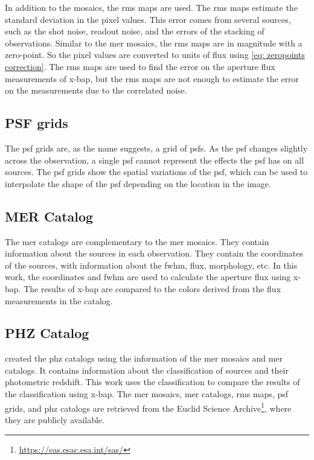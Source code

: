 In addition to the mosaics, the \gls{rms} maps are used. The \gls{rms} maps estimate the standard deviation in the pixel values. This error comes from several sources, such as the shot noise, readout noise, and the errors of the stacking of observations. Similar to the \gls{mer} mosaics, the \gls{rms} maps are in magnitude with a zero-point. So the pixel values are converted to units of flux using \autoref{eq: zeropoints correction}. The \gls{rms} maps are used to find the error on the aperture flux measurements of \gls{x-bap}, but the \gls{rms} maps are not enough to estimate the error on the measurements due to the correlated noise.

\subsection{PSF grids}

The \gls{psf} grids are, as the name suggests, a grid of \glspl{psf}. As the \gls{psf} changes slightly across the observation, a single \gls{psf} cannot represent the effects the \gls{psf} has on all sources. The \gls{psf} grids show the spatial variations of the \gls{psf}, which can be used to interpolate the shape of the \gls{psf} depending on the location in the image. 

\subsection{MER Catalog}

The \gls{mer} catalogs are complementary to the \gls{mer} mosaics. They contain information about the sources in each observation. They contain the coordinates of the sources, with information about the \gls{fwhm}, flux, morphology, etc. In this work, the coordinates and \gls{fwhm} are used to calculate the aperture flux using \gls{x-bap}. The results of \gls{x-bap} are compared to the colors derived from the flux measurements in the catalog.

\subsection{PHZ Catalog}

\cite{euclid_collaboration_euclid_2026} created the \gls{phz} catalogs using the information of the \gls{mer} mosaics and \gls{mer} catalogs. It contains information about the classification of sources and their photometric redshift. This work uses the classification to compare the results of the classification using \gls{x-bap}.
\newline
The \gls{mer} mosaics, \gls{mer} catalogs, \gls{rms} maps, \gls{psf} grids, and \gls{phz} catalogs are retrieved from the Euclid Science Archive\footnote{\url{https://eas.esac.esa.int/sas/}}, where they are publicly available.

\newpage